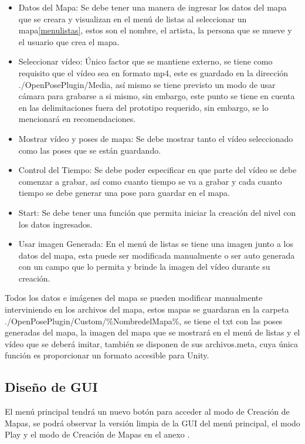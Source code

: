 \begin{itemize}
	\item Datos del Mapa: Se debe tener una manera de ingresar los datos del mapa que se creara y visualizan en el menú de listas al seleccionar un mapa\ref{menulistas}, estos son el nombre, el artista, la persona que se mueve y el usuario que crea el mapa.
	\item Seleccionar vídeo: Único factor que se mantiene externo, se tiene como requisito que el vídeo sea en formato mp4, este es guardado en la dirección ./OpenPosePlugin/Media, así mismo se tiene previsto un modo de usar cámara para grabarse a si mismo, sin embargo, este punto se tiene en cuenta en las delimitaciones fuera del prototipo requerido, sin embargo, se lo mencionará en recomendaciones.
	\item Mostrar vídeo y poses de mapa: Se debe mostrar tanto el vídeo seleccionado como las poses que se están guardando.
	\item Control del Tiempo: Se debe poder especificar en que parte del vídeo se debe comenzar a grabar, así como cuanto tiempo se va a grabar y cada cuanto tiempo se debe generar una pose para guardar en el mapa. 
	\item Start: Se debe tener una función que permita iniciar la creación del nivel con los datos ingresados.
	\item Usar imagen Generada: En el menú de listas se tiene una imagen junto a los datos del mapa, esta puede ser modificada manualmente o ser auto generada con un campo que lo permita y brinde la imagen del vídeo durante su creación.
\end{itemize}

Todos los datos e imágenes del mapa se pueden modificar manualmente interviniendo en los archivos del mapa, estos mapas se guardaran en la carpeta ./OpenPosePlugin/Custom/\%NombredelMapa\%, se tiene el txt con las poses generadas del mapa, la imagen del mapa que se mostrará en el menú de listas y el vídeo que se deberá imitar, también se disponen de sus archivos.meta, cuya única función es proporcionar un formato accesible para Unity.

\subsection{Diseño de GUI}

El menú principal tendrá un nuevo botón para acceder al modo de Creación de Mapas, se podrá observar la versión limpia de la GUI del menú principal, el modo Play y el modo de Creación de Mapas en el anexo .

